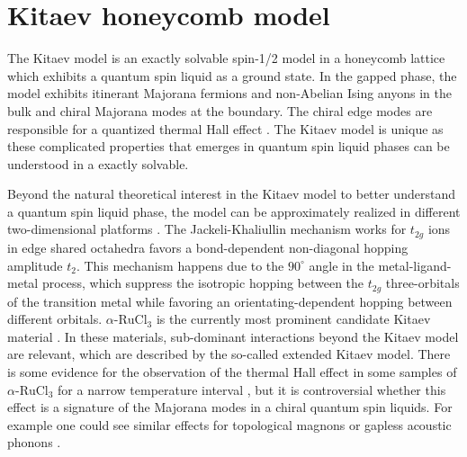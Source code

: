 

\section{Kitaev honeycomb model}

The Kitaev model is an exactly solvable spin-1/2 model in a honeycomb lattice which exhibits a quantum spin liquid as a ground state\cite{Kitaev_2006}.
In the gapped phase, the model exhibits itinerant Majorana fermions and non-Abelian Ising anyons in the bulk and chiral Majorana modes at the boundary.
The chiral edge modes are responsible for a quantized thermal Hall effect \cite{Kitaev2006}.
The Kitaev model is unique as these complicated properties that emerges in quantum spin liquid phases can be understood in a exactly solvable.


Beyond the natural theoretical interest in the Kitaev model to better understand a quantum spin liquid phase, the model can be approximately realized in different two-dimensional platforms \cite{Jackeli2009, trebst2017kitaev, Winter_2016, Winter_2017, takagi2019}.
The Jackeli-Khaliullin mechanism works for $t_{2g}$ ions in edge shared octahedra %
favors a bond-dependent non-diagonal hopping amplitude $t_2$.
This mechanism happens due to the $90^\circ$ angle in the metal-ligand-metal process, which suppress the isotropic hopping between the $t_{2g}$ three-orbitals of the transition metal
while favoring an orientating-dependent hopping between different orbitals.
$\alpha\text{-RuCl}_3$ is the currently most prominent candidate Kitaev material \cite{Sandilands2015,Banerjee2016}.
In these materials, sub-dominant interactions beyond the Kitaev model are relevant, which are described by the so-called extended Kitaev model.
There is some evidence for the observation of the thermal Hall effect in some samples of $\alpha\text{-RuCl}_3$  for a narrow temperature interval \cite{Kasahara2018,Motome2020,Yokoi_2021,Ye2018}, but it is controversial whether this effect is a signature of the  Majorana modes in a chiral quantum spin liquids. For example one could see similar effects for topological magnons \cite{Sahasrabudhe_2020,Czajka_2022} or gapless acoustic phonons \cite{Vinkler_Aviv_2018}.



